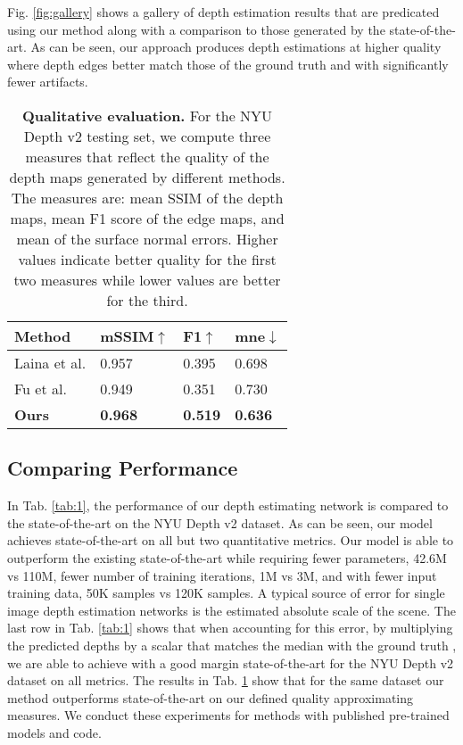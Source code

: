 \documentclass[10pt,twocolumn,letterpaper]{article}
\begin{document}
Fig. \ref{fig:gallery} shows a gallery of depth estimation results that are predicated using our method along with a comparison to those generated by the state-of-the-art.
As can be seen, our approach produces depth estimations at higher quality where depth edges better match those of the ground truth and with significantly fewer artifacts. 

\begin{table}[t]
\centering
\begin{tabular}{l|lll}
\toprule
Method         & mSSIM$\uparrow$ & F1$\uparrow$ & mne$\downarrow$  \\ 
\midrule
Laina et al. \cite{Laina2016}    & 0.957     &  0.395  & 0.698  \\
Fu et al. \cite{Fu2018DeepOR}    & 0.949      &  0.351  & 0.730  \\
\textbf{Ours}                    & \textbf{0.968}  & \textbf{0.519} & \textbf{0.636} \\
\bottomrule
\end{tabular}
\bigskip
\caption{\textbf{Qualitative evaluation.} For the NYU Depth v2 testing set, we compute three measures that reflect the quality of the depth maps generated by different methods. The measures are: mean SSIM of the depth maps, mean F1 score of the edge maps, and mean of the surface normal errors. Higher values indicate better quality for the first two measures while lower values are better for the third. }
\label{tab:2}
\end{table}


\subsection{Comparing Performance}


In Tab. \ref{tab:1}, the performance of our depth estimating network is compared to the state-of-the-art on the NYU Depth v2 dataset. As can be seen, our model achieves state-of-the-art on all but two quantitative metrics. Our model is able to outperform the existing state-of-the-art \cite{Fu2018DeepOR} while requiring fewer parameters, 42.6M vs 110M, fewer number of training iterations, 1M vs 3M, and with fewer input training data, 50K samples vs 120K samples. A typical source of error for single image depth estimation networks is the estimated absolute scale of the scene. The last row in Tab. \ref{tab:1} shows that when accounting for this error, by multiplying the predicted depths by a scalar that matches the median with the ground truth \cite{Zhou2017}, we are able to achieve with a good margin state-of-the-art for the NYU Depth v2 dataset on all metrics. The results in Tab. \ref{tab:2} show that for the same dataset our method outperforms state-of-the-art on our defined quality approximating measures. We conduct these experiments for methods with published pre-trained models and code.
\end{document}
